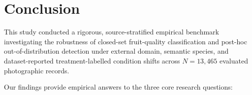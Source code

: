 \par\vspace*{-18pt}\section{Conclusion}
\vspace*{-4pt}
\label{sec:conclusion}

This study conducted a rigorous, source-stratified empirical benchmark investigating the robustness of closed-set fruit-quality classification and post-hoc out-of-distribution detection under external domain, semantic species, and dataset-reported treatment-labelled condition shifts across $N = 13,465$ evaluated photographic records.

Our findings provide empirical answers to the three core research questions:
\vspace*{-4pt}
